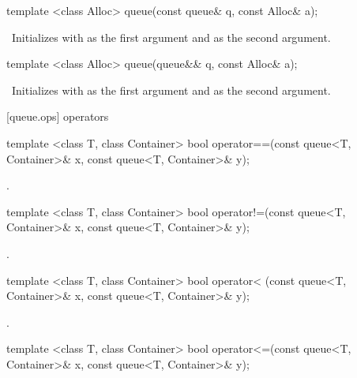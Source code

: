 \begin{itemdecl}
template <class Alloc> queue(const queue& q, const Alloc& a);
\end{itemdecl}

\begin{itemdescr}
\pnum
\effects\ Initializes  with  as the first argument and  as the
second argument.
\end{itemdescr}

\begin{itemdecl}
template <class Alloc> queue(queue&& q, const Alloc& a);
\end{itemdecl}

\begin{itemdescr}
\pnum
\effects\ Initializes  with  as the first argument and 
as the second argument.
\end{itemdescr}

[queue.ops]{ operators}

%
\begin{itemdecl}
template <class T, class Container>
  bool operator==(const queue<T, Container>& x, const queue<T, Container>& y);
\end{itemdecl}

\begin{itemdescr}
\pnum
\returns
{}.
\end{itemdescr}

%
\begin{itemdecl}
template <class T, class Container>
  bool operator!=(const queue<T, Container>& x,  const queue<T, Container>& y);
\end{itemdecl}

\begin{itemdescr}
\pnum
\returns
{}.
\end{itemdescr}

%
\begin{itemdecl}
template <class T, class Container>
  bool operator< (const queue<T, Container>& x, const queue<T, Container>& y);
\end{itemdecl}

\begin{itemdescr}
\pnum
\returns
{}.
\end{itemdescr}

%
\begin{itemdecl}
template <class T, class Container>
  bool operator<=(const queue<T, Container>& x, const queue<T, Container>& y);
\end{itemdecl}

